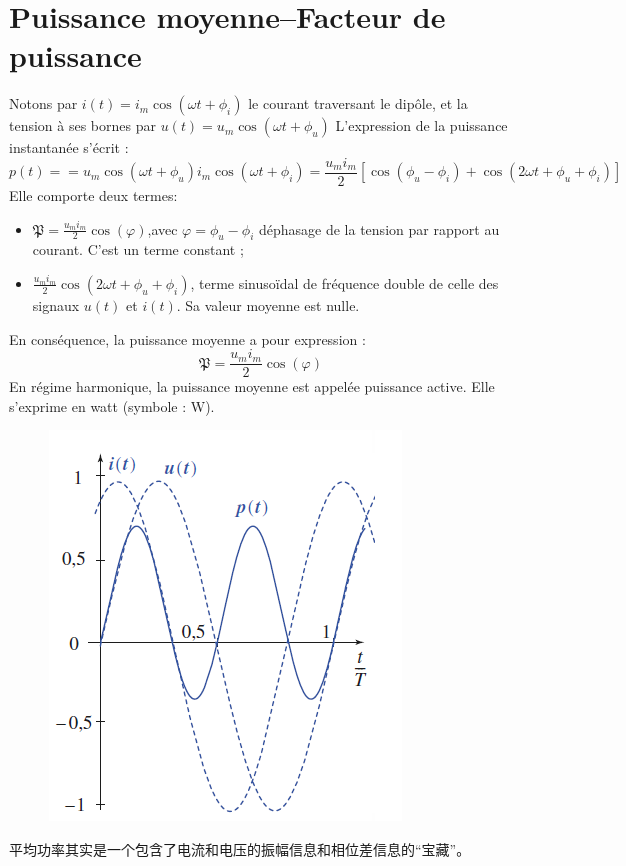 \documentclass[12pt]{book}
\theoremstyle{definition}\newtheorem{dfn}{Définition}[chapter]
\theoremstyle{plain}\newtheorem{thm}{Théorème}[chapter]
\theoremstyle{plain}\newtheorem{prp}{Proposition}[chapter]
\theoremstyle{plain}\newtheorem{lem}{\bf Lemme}[chapter]
\theoremstyle{plain}\newtheorem{axm}{\bf Axiome}[chapter]
\theoremstyle{plain}\newtheorem{lmm}{\bf Lemme}[chapter]
\theoremstyle{plain}\newtheorem{cor}{\bf Corollaire}[chapter]
\theoremstyle{remark}\newtheorem{rem}{Remarque}[chapter]
\begin{document}
\section{Puissance moyenne–Facteur de puissance}
Notons par $i(t)=i_m\cos(\omega t+\phi_{i})$ le courant traversant le dipôle, et la tension
à ses bornes par $u(t)=u_m\cos(\omega t+\phi_{u})$
L'expression de la puissance instantanée s'écrit :
$$
p(t)==u_m\cos(\omega t+\phi_{u})i_m\cos(\omega t+\phi_{i})=\frac{u_mi_m}{2}[\cos(\phi_{u}-\phi_{i})+\cos(2\omega t+\phi_{u}+\phi_{i})]
$$
Elle comporte deux termes:
\begin{itemize}
\item $\mathfrak{P}=\frac{u_mi_m}{2}\cos(\varphi)$,avec
$\varphi=\phi_{u}-\phi_{i}$ déphasage de la tension par rapport au courant. C'est un terme constant ;
\item $\frac{u_mi_m}{2}\cos(2\omega t+\phi_{u}+\phi_{i})$, terme sinusoïdal de fréquence double de celle des signaux $u(t)$ et $i(t)$. Sa valeur moyenne est nulle.
\end{itemize}
En conséquence, la puissance moyenne a pour expression :
$$
\mathfrak{P}=\frac{u_mi_m}{2}\cos(\varphi)
$$
En régime harmonique, la puissance moyenne est appelée puissance active. Elle s'exprime en watt (symbole : W).
\begin{figure}[H]
	\centering
	\includegraphics[scale=1]{image//Regime sinusoidal force//2}
\end{figure}
平均功率其实是一个包含了电流和电压的振幅信息和相位差信息的“宝藏”。
\end{document}
